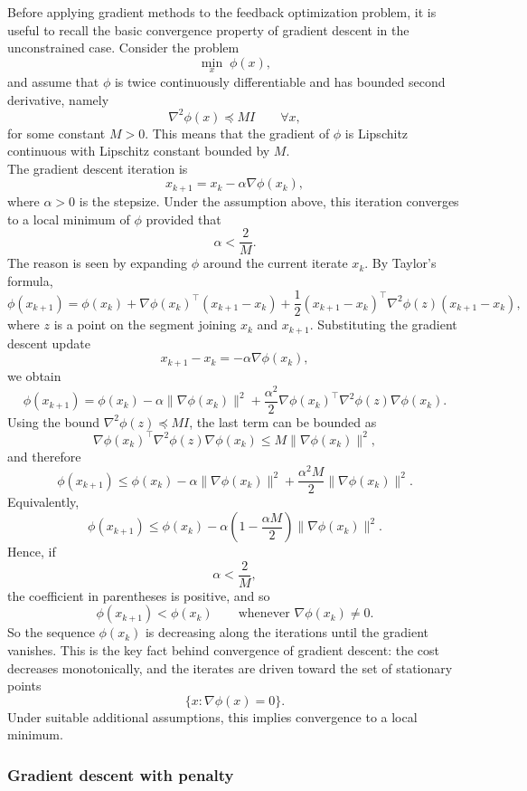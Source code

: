 Before applying gradient methods to the feedback optimization problem, it is useful to recall the basic convergence property of gradient descent in the unconstrained case. Consider the problem
\[
\min_x \; \phi(x),
\]
and assume that $\phi$ is twice continuously differentiable and has bounded second derivative, namely
\[
\nabla^2 \phi(x) \preceq MI
\qquad \forall x,
\]
for some constant $M>0$. This means that the gradient of $\phi$ is Lipschitz continuous with Lipschitz constant bounded by $M$.\\
The gradient descent iteration is
\[
x_{k+1}=x_k-\alpha \nabla \phi(x_k),
\]
where $\alpha>0$ is the stepsize. Under the assumption above, this iteration converges to a local minimum of $\phi$ provided that
\[
\alpha < \frac{2}{M}.
\]
The reason is seen by expanding $\phi$ around the current iterate $x_k$. By Taylor's formula,
\[
\phi(x_{k+1})
=
\phi(x_k)
+
\nabla \phi(x_k)^\top (x_{k+1}-x_k)
+
\frac{1}{2}(x_{k+1}-x_k)^\top \nabla^2\phi(z)(x_{k+1}-x_k),
\]
where $z$ is a point on the segment joining $x_k$ and $x_{k+1}$. Substituting the gradient descent update
\[
x_{k+1}-x_k=-\alpha \nabla\phi(x_k),
\]
we obtain
\[
\phi(x_{k+1})
=
\phi(x_k)
-\alpha \|\nabla\phi(x_k)\|^2
+
\frac{\alpha^2}{2}\nabla\phi(x_k)^\top \nabla^2\phi(z)\nabla\phi(x_k).
\]
Using the bound $\nabla^2\phi(z)\preceq MI$, the last term can be bounded as
\[
\nabla\phi(x_k)^\top \nabla^2\phi(z)\nabla\phi(x_k)
\leq
M\|\nabla\phi(x_k)\|^2,
\]
and therefore
\[
\phi(x_{k+1})
\leq
\phi(x_k)
-\alpha \|\nabla\phi(x_k)\|^2
+
\frac{\alpha^2 M}{2}\|\nabla\phi(x_k)\|^2.
\]
Equivalently,
\[
\phi(x_{k+1})
\leq
\phi(x_k)
-\alpha\left(1-\frac{\alpha M}{2}\right)\|\nabla\phi(x_k)\|^2.
\]
Hence, if
\[
\alpha<\frac{2}{M},
\]
the coefficient in parentheses is positive, and so
\[
\phi(x_{k+1})<\phi(x_k)
\qquad \text{whenever } \nabla\phi(x_k)\neq 0.
\]
So the sequence $\phi(x_k)$ is decreasing along the iterations until the gradient vanishes. This is the key fact behind convergence of gradient descent: the cost decreases monotonically, and the iterates are driven toward the set of stationary points
\[
\{x:\nabla\phi(x)=0\}.
\]
Under suitable additional assumptions, this implies convergence to a local minimum.

\subsubsection{Gradient descent with penalty}

